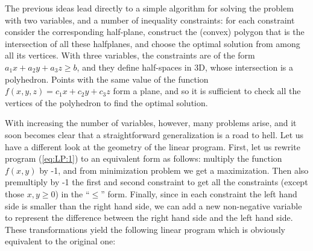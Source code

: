 \noindent
\begin{minipage}[t]{\textwidth-6cm}
\vspace{0pt}
The previous ideas lead directly to a simple algorithm for solving the problem with
two variables, and a number of inequality constraints: for each constraint consider the
corresponding half-plane, construct the (convex) polygon that is the intersection 
of all these halfplanes, and choose the optimal solution from among all its vertices.
With three variables, the constraints are of the form $a_1x+a_2y+a_3z\ge b$, and they 
define half-spaces in 3D, whose intersection is a polyhedron. Points with the
same value of the function $f(x,y,z)=c_1x+c_2y+c_3z$ form a plane, and so it is sufficient to
check all the vertices of the polyhedron to find the optimal solution.\\
\end{minipage}
\begin{minipage}[t]{6cm}
  \vspace{0pt}
  
\end{minipage}


\noindent 
With increasing the number of variables, however, many problems arise, and it
soon becomes clear that a straightforward generalization is a road to hell. 
Let us have a different look at the geometry of the linear program. First, 
let us rewrite program (\ref{eq:LP:1}) to an equivalent form as follows:
multiply the function $f(x,y)$ by -1, and from minimization problem we get a maximization.
Then also premultiply by -1 the first and second constraint to get all the constraints
(except those $x,y\ge0$) in the ``$\le$'' form. Finally, since in each constraint the 
left hand side is smaller than the right hand side, we can add a new non-negative variable 
to represent the difference between the right hand side and the left hand side. These
transformations yield the following linear program which is obviously equivalent to the original one:

